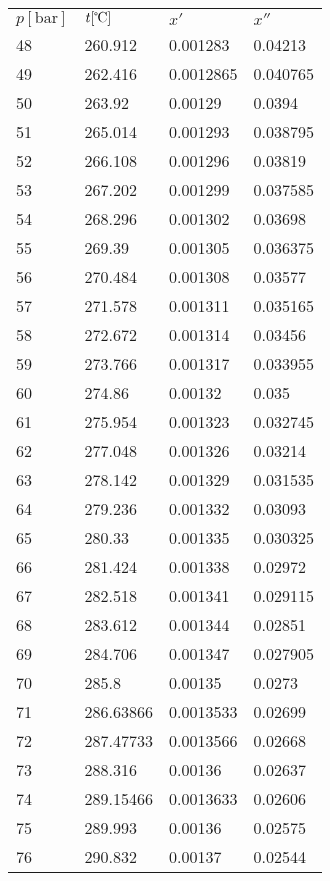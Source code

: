 \documentclass[twocolumn]{article}
\begin{document}
\begin{tabular}{l|l|l|l}
$p [\text{bar}] $ & $t [\text{\textcelsius{}}]$ & $x'$ & $x''$ \\
48	&	260.912	&	0.001283	&	0.04213  \\ \hline
49	&	262.416	&	0.0012865	&	0.040765  \\ \hline
50	&	263.92	&	0.00129	&	0.0394  \\ \hline
51	&	265.014	&	0.001293	&	0.038795  \\ \hline
52	&	266.108	&	0.001296	&	0.03819  \\ \hline
53	&	267.202	&	0.001299	&	0.037585  \\ \hline
54	&	268.296	&	0.001302	&	0.03698  \\ \hline
55	&	269.39	&	0.001305	&	0.036375  \\ \hline
56	&	270.484	&	0.001308	&	0.03577  \\ \hline
57	&	271.578	&	0.001311	&	0.035165  \\ \hline
58	&	272.672	&	0.001314	&	0.03456  \\ \hline
59	&	273.766	&	0.001317	&	0.033955  \\ \hline
60	&	274.86	&	0.00132	&	0.035  \\ \hline
61	&	275.954	&	0.001323	&	0.032745  \\ \hline
62	&	277.048	&	0.001326	&	0.03214  \\ \hline
63	&	278.142	&	0.001329	&	0.031535  \\ \hline
64	&	279.236	&	0.001332	&	0.03093  \\ \hline
65	&	280.33	&	0.001335	&	0.030325  \\ \hline
66	&	281.424	&	0.001338	&	0.02972  \\ \hline
67	&	282.518	&	0.001341	&	0.029115  \\ \hline
68	&	283.612	&	0.001344	&	0.02851  \\ \hline
69	&	284.706	&	0.001347	&	0.027905  \\ \hline
70	&	285.8	&	0.00135	&	0.0273  \\ \hline
71	&	286.63866&	0.0013533&	0.02699  \\ \hline
72	&	287.47733&	0.0013566&	0.02668  \\ \hline
73	&	288.316	&	0.00136	&	0.02637  \\ \hline
74	&	289.15466&	0.0013633&	0.02606  \\ \hline
75	&	289.993&	0.00136&	0.02575  \\ \hline
76	&	290.832	&	0.00137	&	0.02544  \\ \hline

\end{tabular}
\end{document}
